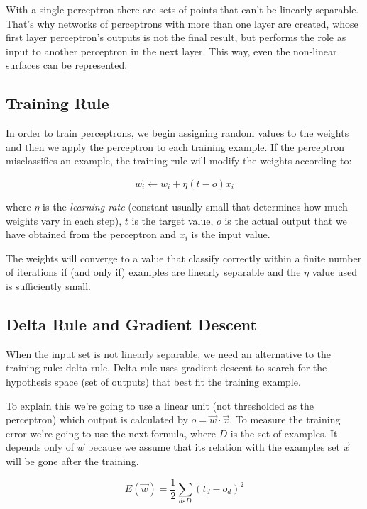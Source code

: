	With a single perceptron there are sets of points that can't be linearly separable. That's why networks of perceptrons with more than one layer are created, whose first layer perceptron's outputs is not the final result, but performs the role as input to another perceptron in the next layer. This way, even the non-linear surfaces can be represented.

	\subsection{Training Rule}
	In order to train perceptrons, we begin assigning random values to the weights and then we apply the perceptron to each training example. If the perceptron misclassifies an example, the training rule will modify the weights according to:

	\begin{equation}
		\label{training_rule}
		w_{i}^{'} \leftarrow w_{i} + \eta (t - o) x_{i}
	\end{equation}

	where $\eta$ is the \textit{learning rate} (constant usually small that determines how much weights vary in each step), $t$ is the target value, $o$ is the actual output that we have obtained from the perceptron and $x_{i}$ is the input value.

	The weights will converge to a value that classify correctly within a finite number of iterations if (and only if) examples are linearly separable and the $\eta$ value used is sufficiently small.
	
	\subsection{Delta Rule and Gradient Descent}
	When the input set is not linearly separable, we need an alternative to the training rule: delta rule. Delta rule uses gradient descent to search for the hypothesis space (set of outputs) that best fit the training example. 

	To explain this we’re going to use a linear unit (not thresholded as the perceptron) which output is calculated by $o = \vec{w} \cdot \vec{x}$. To measure the training error we’re going to use the next formula, where $D$ is the set of examples. It depends only of $\vec{w}$ because we assume that its relation with the examples set $\vec{x}$ will be gone after the training.

	\begin{equation}
		\label{error_function_full_square}
		E(\vec{w}) = \frac{1}{2} \sum_{d \varepsilon D} (t_d-o_d)^2 
	\end{equation}

